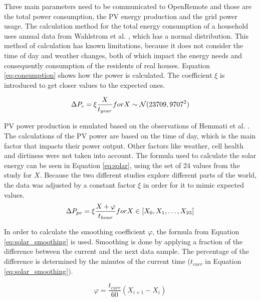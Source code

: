 Three main parameters need to be communicated to OpenRemote and those are the total power consumption, the PV energy production and the grid power usage. The calculation method for the total energy consumption of a household uses annual data from Wahlstrom et al. \cite{wahlstrom2015residential}, which has a normal distribution. This method of calculation has known limitations, because it does not consider the time of day and weather changes, both of which impact the energy needs and consequently consumption of the residents of real houses. Equation \ref{eq:consumption} shows how the power is calculated. The coefficient $\xi$ is introduced to get closer values to the expected ones. 

\begin{equation}\label{eq:consumption}
    \Delta P_c = \xi\frac{X}{t_{year}} \space for \space X \sim \mathcal{N}(23709,9707^2)
\end{equation}


PV power production is emulated based on the observations of Hemmati et al. \cite{hemmati2017stochastic}. The calculations of the PV power are based on the time of day, which is the main factor that impacts their power output. Other factors like weather, cell health and dirtiness were not taken into account. The formula used to calculate the solar energy can be seen in Equation \ref{eq:solar}, using the set of 24 values from the study for $X$. Because the two different studies explore different parts of the world, the data was adjusted by a constant factor $\xi$ in order for it to mimic expected values.
\begin{equation}\label{eq:solar}
    \Delta P_{pv} = \xi\frac{X + \varphi}{t_{hour}} \space for \space X \in [X_0, X_1,\dotsc,X_{23}]
\end{equation}

In order to calculate the smoothing coefficient $\varphi$, the formula from Equation \ref{eq:solar_smoothing} is used. Smoothing is done by applying a fraction of the difference between the current and the next data sample. The percentage of the difference is determined by the minutes of the current time ($t_{curr}$ in Equation \ref{eq:solar_smoothing}).

\begin{equation}\label{eq:solar_smoothing}
    \varphi = \frac{t_{curr}}{60}(X_{i+1} - X_{i})
\end{equation}

